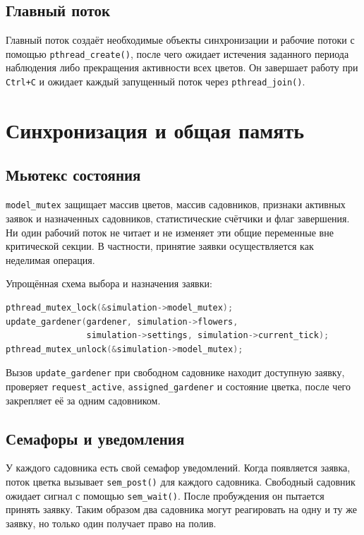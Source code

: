 \documentclass[12pt,a4paper]{article}
\begin{document}
\subsection{Главный поток}

Главный поток создаёт необходимые объекты синхронизации и рабочие
потоки с помощью \texttt{pthread\_create()}, после чего ожидает истечения
заданного периода наблюдения либо прекращения активности всех цветов.
Он завершает работу при \texttt{Ctrl+C} и ожидает каждый запущенный поток
через \texttt{pthread\_join()}.

\section{Синхронизация и общая память}

\subsection{Мьютекс состояния}

\texttt{model\_mutex} защищает массив цветов, массив садовников, признаки
активных заявок и назначенных садовников, статистические счётчики и
флаг завершения. Ни один рабочий поток не читает и не изменяет эти
общие переменные вне критической секции. В частности, принятие заявки
осуществляется как неделимая операция.

Упрощённая схема выбора и назначения заявки:
\begin{lstlisting}[language=C]
pthread_mutex_lock(&simulation->model_mutex);
update_gardener(gardener, simulation->flowers,
                simulation->settings, simulation->current_tick);
pthread_mutex_unlock(&simulation->model_mutex);
\end{lstlisting}

Вызов \texttt{update\_gardener} при свободном садовнике находит доступную
заявку, проверяет \texttt{request\_active}, \texttt{assigned\_gardener}
и состояние цветка, после чего закрепляет её за одним садовником.

\subsection{Семафоры и уведомления}

У каждого садовника есть свой семафор уведомлений.
Когда появляется заявка, поток цветка вызывает \texttt{sem\_post()}
для каждого садовника. Свободный садовник ожидает сигнал с помощью
\texttt{sem\_wait()}. После пробуждения он пытается принять заявку. Таким образом два садовника могут реагировать на одну и ту же
заявку, но только один получает право на полив.
\end{document}

